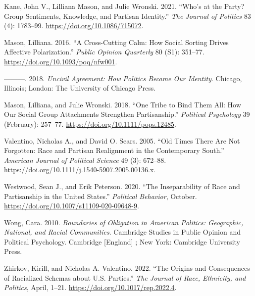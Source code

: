 \documentclass[
  12pt,
]{article}
\newlength{\cslhangindent}
\newlength{\cslentryspacingunit} %
\newenvironment{CSLReferences}[2] %
 {%
  \setlength{\parindent}{0pt}
  \ifodd #1
  \let\oldpar\par
  \def\par{\hangindent=\cslhangindent\oldpar}
  \fi
  \setlength{\parskip}{#2\cslentryspacingunit}
 }%
 {}
\begin{document}
\begin{CSLReferences}{1}{0}
\leavevmode{}%
Kane, John V., Lilliana Mason, and Julie Wronski. 2021. {``Who{'}s at
the Party? Group Sentiments, Knowledge, and Partisan Identity.''}
\emph{The Journal of Politics} 83 (4): 1783--99.
\url{https://doi.org/10.1086/715072}.

\leavevmode{}%
Mason, Lilliana. 2016. {``A Cross-Cutting Calm: How Social Sorting
Drives Affective Polarization.''} \emph{Public Opinion Quarterly} 80
(S1): 351--77. \url{https://doi.org/10.1093/poq/nfw001}.

\leavevmode{}%
---------. 2018. \emph{Uncivil Agreement: How Politics Became Our
Identity}. Chicago, Illinois; London: The University of Chicago Press.

\leavevmode{}%
Mason, Lilliana, and Julie Wronski. 2018. {``One Tribe to Bind Them All:
How Our Social Group Attachments Strengthen Partisanship.''}
\emph{Political Psychology} 39 (February): 257--77.
\url{https://doi.org/10.1111/pops.12485}.

\leavevmode{}%
Valentino, Nicholas A., and David O. Sears. 2005. {``Old Times There Are
Not Forgotten: Race and Partisan Realignment in the Contemporary
South.''} \emph{American Journal of Political Science} 49 (3): 672--88.
\url{https://doi.org/10.1111/j.1540-5907.2005.00136.x}.

\leavevmode{}%
Westwood, Sean J., and Erik Peterson. 2020. {``The Inseparability of
Race and Partisanship in the United States.''} \emph{Political
Behavior}, October. \url{https://doi.org/10.1007/s11109-020-09648-9}.

\leavevmode{}%
Wong, Cara. 2010. \emph{Boundaries of Obligation in American Politics:
Geographic, National, and Racial Communities}. Cambridge Studies in
Public Opinion and Political Psychology. Cambridge {[}England{]} ; New
York: Cambridge University Press.

\leavevmode{}%
Zhirkov, Kirill, and Nicholas A. Valentino. 2022. {``The Origins and
Consequences of Racialized Schemas about U.S. Parties.''} \emph{The
Journal of Race, Ethnicity, and Politics}, April, 1--21.
\url{https://doi.org/10.1017/rep.2022.4}.

\end{CSLReferences}
\end{document}
